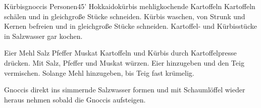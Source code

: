 \begin{MyRecipe}{Kürbisgnoccis}{ Personen}{45'}
	\ingredient[\Calc{0.5}{\x}]{\si{\kilogram}} {Hokkaidokürbis}
	\ingredient[\Calc{0.5}{\x}]{\si{\kilogram}} {mehligkochende Kartoffeln}
	Kartoffeln schälen und in gleichgroße Stücke schneiden. Kürbis waschen, von Strunk und Kernen befreien und in gleichgroße Stücke schneiden. Kartoffel- und Kürbisstücke in Salzwasser gar kochen.\par\bigskip
	
	\ingredient[\Calc{2}{\x}]{} {Eier}
	 {Mehl}
	\ingredient[]{} {Salz}
	\ingredient[]{} {Pfeffer}
	\ingredient[]{} {Muskat}
	Kartoffeln und Kürbis durch Kartoffelpresse drücken. Mit Salz, Pfeffer und Muskat würzen. Eier hinzugeben und den Teig vermischen. Solange Mehl hinzugeben, bis Teig fast krümelig.\par\bigskip
	
 	Gnoccis direkt ins simmernde Salzwasser formen und mit Schaumlöffel wieder heraus nehmen sobald die Gnoccis aufsteigen.
	
	
	
	
	
\end{MyRecipe}